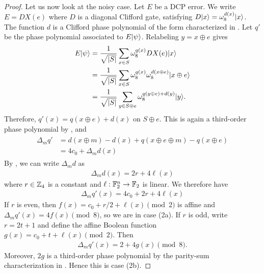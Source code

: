 \begin{proof}
    Let us now look at the noisy case. Let $E$ be a DCP error. We write $E=DX(e)$ where $D$ is a diagonal Clifford gate, satisfying $D|x\rangle=\omega_8^{d(x)} |x\rangle$. The function $d$ is a Clifford phase polynomial of the form characterized in .
    Let $q'$ be the phase polynomial associated to $E|\psi\rangle$.  Relabeling
    $y=x\oplus e$ gives
    \begin{align}
        \begin{split}
            E|\psi\rangle
            &= \frac{1}{\sqrt{|S|}} \sum_{x \in S} \omega_8^{q(x)} DX(e) |x\rangle \\
            &= \frac{1}{\sqrt{|S|}} \sum_{x \in S} \omega_8^{q(x)} \omega_8^{d(x\oplus e)} |x \oplus e\rangle \\
            &= \frac{1}{\sqrt{|S|}} \sum_{y \in S\oplus e}
            \omega_8^{q(y\oplus e)+d(y)} |y\rangle.
        \end{split}
    \end{align}
    Therefore, $q'(x)=q(x \oplus e)+d(x)$ on $S\oplus e$.  This is again
    a third-order phase polynomial by
    ,
    and
    \begin{align}
        \begin{split}
            \Delta_m q' &= d(x \oplus m) - d(x) + q(x \oplus e \oplus m) - q(x \oplus e) \\
            &= 4c_0 + \Delta_m d(x)
        \end{split}
    \end{align}
    By , we can write $\Delta_m d$ as
    \begin{align}
        \Delta_m d(x) = 2r + 4\ell(x)
    \end{align}
    where $r\in\mathbb{Z}_4$ is a constant and $\ell:\mathbb{F}_2^n\to\mathbb{F}_2$ is linear. We therefore have
    \begin{align}
        \Delta_m q'(x) = 4c_0 + 2r + 4\ell(x)
    \end{align}
    If $r$ is even, then
    $f(x)=c_0+r/2+\ell(x)\pmod 2$ is affine and
    $\Delta_mq'(x)=4f(x)\pmod8$, so we are in case (2a).  If $r$ is odd,
    write $r=2t+1$ and define the affine Boolean function
    $g(x)=c_0+t+\ell(x)\pmod2$.  Then
    \begin{align}
        \Delta_m q'(x) = 2 + 4g(x) \pmod 8.
    \end{align}
    Moreover, $2g$ is a third-order phase polynomial by the parity-sum
    characterization in .  Hence this
    is case (2b).


\end{proof}
